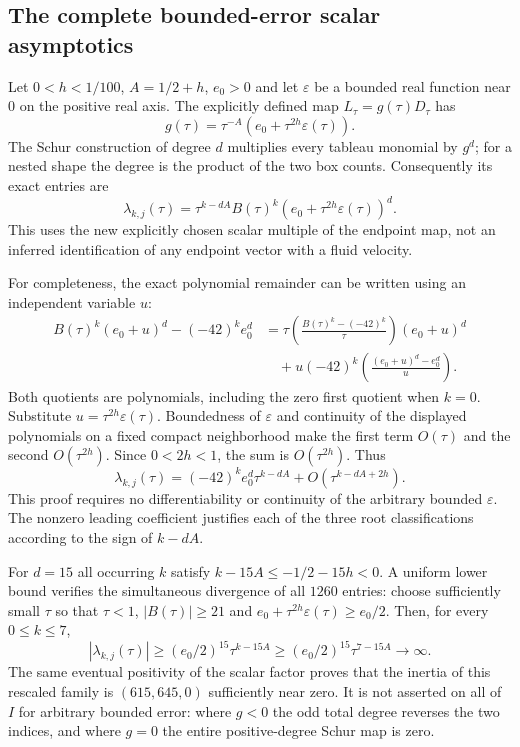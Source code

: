 \subsection*{The complete bounded-error scalar asymptotics}

Let $0<h<1/100$, $A=1/2+h$, $e_0>0$ and let $\varepsilon$
be a bounded real function near $0$ on the positive real axis.
The explicitly defined map $L_\tau=g(\tau)D_\tau$ has
\[
 g(\tau)=\tau^{-A}(e_0+\tau^{2h}\varepsilon(\tau)).
\]
The Schur construction of degree $d$ multiplies every tableau
monomial by $g^d$; for a nested shape the degree is the product of
the two box counts. Consequently its exact entries are
\[
 \lambda_{k,j}(\tau)=\tau^{k-dA}B(\tau)^k
                 (e_0+\tau^{2h}\varepsilon(\tau))^d.
\]
This uses the new explicitly chosen scalar multiple of the endpoint
map, not an inferred identification of any endpoint vector with a
fluid velocity.

For completeness, the exact polynomial remainder can be written
using an independent variable $u$:
\begin{align*}
 B(\tau)^k(e_0+u)^d-(-42)^ke_0^d
 &=\tau\left(\frac{B(\tau)^k-(-42)^k}{\tau}\right)(e_0+u)^d\\
 &\quad+u(-42)^k\left(\frac{(e_0+u)^d-e_0^d}{u}\right).
\end{align*}
Both quotients are polynomials, including the zero first quotient
when $k=0$. Substitute $u=\tau^{2h}\varepsilon(\tau)$.
Boundedness of $\varepsilon$ and continuity of the displayed
polynomials on a fixed compact neighborhood make the first term
$O(\tau)$ and the second $O(\tau^{2h})$. Since $0<2h<1$,
the sum is $O(\tau^{2h})$. Thus
\[
 \lambda_{k,j}(\tau)=(-42)^ke_0^d\tau^{k-dA}
                 +O(\tau^{k-dA+2h}).
\]
This proof requires no differentiability or continuity of the
arbitrary bounded $\varepsilon$. The nonzero leading coefficient
justifies each of the three root classifications according to
the sign of $k-dA$.

For $d=15$ all occurring $k$ satisfy
$k-15A\leq-1/2-15h<0$. A uniform lower bound verifies the
simultaneous divergence of all $1260$ entries: choose sufficiently
small $\tau$ so that $\tau<1$, $|B(\tau)|\geq21$ and
$e_0+\tau^{2h}\varepsilon(\tau)\geq e_0/2$. Then, for every
$0\leq k\leq7$,
\[
 |\lambda_{k,j}(\tau)|
 \geq(e_0/2)^{15}\tau^{k-15A}
 \geq(e_0/2)^{15}\tau^{7-15A}\longrightarrow\infty.
\]
The same eventual positivity of the scalar factor proves that
the inertia of this rescaled family is $(615,645,0)$ sufficiently
near zero. It is not asserted on all of $I$ for arbitrary bounded
error: where $g<0$ the odd total degree reverses the two indices,
and where $g=0$ the entire positive-degree Schur map is zero.


